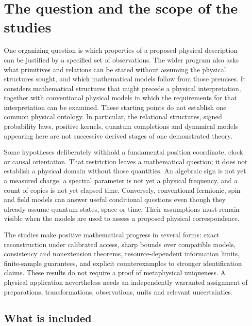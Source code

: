 \section{The question and the scope of the studies}
\label{col:scope}

One organizing question is which properties of a proposed physical description can be justified by a specified set of observations. The wider program also asks what primitives and relations can be stated without assuming the physical structures sought, and which mathematical models follow from those premises. It considers mathematical structures that might precede a physical interpretation, together with conventional physical models in which the requirements for that interpretation can be examined. These starting points do not establish one common physical ontology. In particular, the relational structures, signed probability laws, positive kernels, quantum completions and dynamical models appearing here are not successive derived stages of one demonstrated theory.

Some hypotheses deliberately withhold a fundamental position coordinate, clock or causal orientation. That restriction leaves a mathematical question; it does not establish a physical domain without those quantities. An algebraic sign is not yet a measured charge, a spectral parameter is not yet a physical frequency, and a count of copies is not yet elapsed time. Conversely, conventional fermionic, spin and field models can answer useful conditional questions even though they already assume quantum states, space or time. Their assumptions must remain visible when the models are used to assess a proposed physical correspondence.

The studies make positive mathematical progress in several forms: exact reconstruction under calibrated access, sharp bounds over compatible models, consistency and nonextension theorems, resource-dependent information limits, finite-sample guarantees, and explicit counterexamples to stronger identification claims. These results do not require a proof of metaphysical uniqueness. A physical application nevertheless needs an independently warranted assignment of preparations, transformations, observations, units and relevant uncertainties.

\subsection{What is included}

